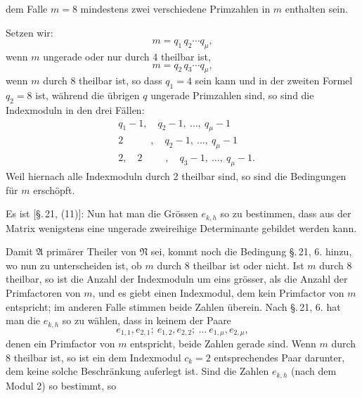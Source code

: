 dem Falle $m = 8$ mindestens zwei verschiedene Primzahlen in $m$ enthalten sein.

Setzen wir:
\[
m = q_1\, q_2 \cdots q_\mu,
\]
wenn $m$ ungerade oder nur durch 4 theilbar ist,
\[
m = q_2\, q_3 \cdots q_\mu,
\]
wenn $m$ durch 8 theilbar ist, so dass $q_1 = 4$ sein kann und in der zweiten Formel $q_2 = 8$ ist, während die übrigen $q$ ungerade Primzahlen sind, so sind die Indexmoduln in den drei Fällen:
\[
\begin{aligned}
& q_1 - 1,\quad q_2 - 1,\ \ldots,\ q_\mu - 1\\
& 2\phantom{{}_1 -{}1,}\ ,\quad q_2 - 1,\ \ldots,\ q_\mu - 1\\
& 2,\quad 2\phantom{{}_1 -{}1}\ ,\quad q_3 - 1,\ \ldots,\ q_\mu - 1.
\end{aligned}
\]
Weil hiernach alle Indexmoduln durch 2 theilbar sind, so sind die Bedingungen für $m$ erschöpft.

Es ist [\S.\,21, (11)]:
Nun hat man die Grössen $e_{k,h}$ so zu bestimmen, dass aus der Matrix
wenigstens eine ungerade zweireihige Determinante gebildet werden kann.

Damit $\mathfrak{A}$ primärer Theiler von $\mathfrak{N}$ sei, kommt noch die Bedingung \S.\,21, 6. hinzu, wo nun zu unterscheiden ist, ob $m$ durch 8 theilbar ist oder nicht. Ist $m$ durch 8 theilbar, so ist die Anzahl der Indexmoduln um eins grösser, als die Anzahl der Primfactoren von $m$, und es giebt einen Indexmodul, dem kein Primfactor von $m$ entspricht; im anderen Falle stimmen beide Zahlen überein. Nach \S.\,21, 6. hat man die $e_{k,h}$ so zu wählen, dass in keinem der Paare
\[
e_{1,1}, e_{2,1};\ e_{1,2}, e_{2,2};\ \ldots\ e_{1,\mu}, e_{2,\mu},
\]
denen ein Primfactor von $m$ entspricht, beide Zahlen gerade sind. Wenn $m$ durch 8 theilbar ist, so ist ein dem Indexmodul $c_k = 2$ entsprechendes Paar darunter, dem keine solche Beschränkung auferlegt ist. Sind die Zahlen $e_{k,h}$ (nach dem Modul 2) so bestimmt, so
